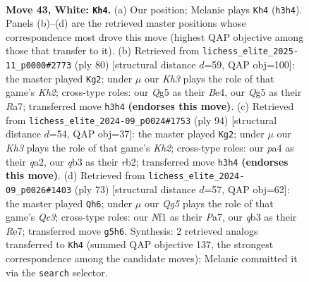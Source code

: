 \documentclass[11pt]{article}
\begin{document}
\clearpage

\begin{figure}[p]\centering
\begin{subfigure}{0.46\textwidth}\centering
\resizebox{\linewidth}{!}{%
\newchessgame
\chessboard[
  setfen={r5r1/p5pp/2kb4/3p2QP/p2P2P1/1q2P2K/8/5N2 w - - 0 43},
  showmover=false,
  pgfstyle=straightmove, color=movearrow, markmove={h3-h4}
]}
\caption{}
\end{subfigure}\hfill
\begin{subfigure}{0.46\textwidth}\centering
\resizebox{\linewidth}{!}{%
\newchessgame
\chessboard[
  setfen={2rq2k1/R1pb1p2/6p1/2QP3p/4B3/6PP/5P1K/8 w - - 1 41},
  showmover=false,
  pgfstyle=straightmove, color=movearrow, markmove={h2-g2}
]}
\caption{}
\end{subfigure}
\\[4pt]
\begin{subfigure}{0.46\textwidth}\centering
\resizebox{\linewidth}{!}{%
\newchessgame
\chessboard[
  setfen={2R5/5ppk/1p2p2p/7P/3P4/5QP1/qr3P1K/8 w - - 1 48},
  showmover=false,
  pgfstyle=straightmove, color=movearrow, markmove={h2-g2}
]}
\caption{}
\end{subfigure}\hfill
\begin{subfigure}{0.46\textwidth}\centering
\resizebox{\linewidth}{!}{%
\newchessgame
\chessboard[
  setfen={5k2/p3rp2/2q5/1p2PQ1P/2p5/2P5/PP3RPK/8 b - - 0 37},
  showmover=false,
  pgfstyle=straightmove, color=movearrow, markmove={c6-h6}
]}
\caption{}
\end{subfigure}
\caption{\textbf{Move 43, White: \texttt{Kh4}.} (a) Our position; Melanie plays \texttt{Kh4} (\texttt{h3h4}). Panels (b)--(d) are the retrieved master positions whose correspondence most drove this move (highest QAP objective among those that transfer to it). (b) Retrieved from \texttt{lichess\_elite\_2025-11\_p0000\#2773} (ply 80) [structural distance $d$=59, QAP obj=100]: the master played \texttt{Kg2}; under $\mu$ our \emph{Kh3} plays the role of that game's \emph{Kh2}; cross-type roles: our \emph{Q}g5 as their \emph{B}e4, our \emph{Q}g5 as their \emph{R}a7; transferred move \texttt{h3h4} \textbf{(endorses this move)}. (c) Retrieved from \texttt{lichess\_elite\_2024-09\_p0024\#1753} (ply 94) [structural distance $d$=54, QAP obj=37]: the master played \texttt{Kg2}; under $\mu$ our \emph{Kh3} plays the role of that game's \emph{Kh2}; cross-type roles: our \emph{p}a4 as their \emph{q}a2, our \emph{q}b3 as their \emph{r}b2; transferred move \texttt{h3h4} \textbf{(endorses this move)}. (d) Retrieved from \texttt{lichess\_elite\_2024-09\_p0026\#1403} (ply 73) [structural distance $d$=57, QAP obj=62]: the master played \texttt{Qh6}; under $\mu$ our \emph{Qg5} plays the role of that game's \emph{Qc3}; cross-type roles: our \emph{N}f1 as their \emph{P}a7, our \emph{q}b3 as their \emph{R}e7; transferred move \texttt{g5h6}. Synthesis: 2 retrieved analogs transferred to \texttt{Kh4} (summed QAP objective 137, the strongest correspondence among the candidate moves); Melanie committed it via the \texttt{search} selector.}
\label{fig:thought-m84}
\end{figure}
\end{document}

